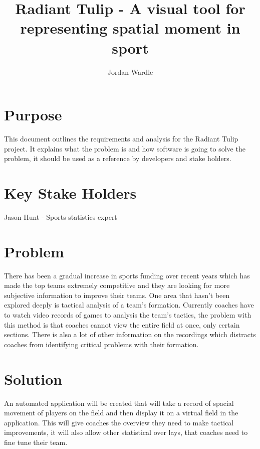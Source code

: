 \documentclass[12pt]{article}
\title{Radiant Tulip - 
A visual tool for representing spatial moment in sport}
\author{Jordan Wardle}
\begin{document}
	\maketitle
	
	\tableofcontents
	
	\section{Purpose}
	This document outlines the requirements and analysis for the Radiant Tulip project.
	It explains what the problem is and how software is going to solve the problem, it should be used as a reference by developers and stake holders.
	
	\section{Key Stake Holders}
	\begin{list}{}{}
		\item Jason Hunt - Sports statistics expert
	\end{list}
	
	\pagebreak
	
	\section{Problem}
	There has been a gradual increase in sports funding over recent years which has made the top teams extremely competitive and they are looking for more subjective information to improve their teams.
	One area that hasn't been explored deeply is tactical analysis of a team's formation.
	Currently coaches have to watch video records of games to analysis the team's tactics, the problem with this method is that coaches cannot view the entire field at once, only certain sections.
	There is also a lot of other information on the recordings which distracts coaches from identifying critical problems with their formation.
	
	\section{Solution}
	An automated application will be created that will take a record of spacial movement of players on the field and then display it on a virtual field in the application.
	This will give coaches the overview they need to make tactical improvements, it will also allow other statistical over lays, that coaches need to fine tune their team.
	
\end{document}

